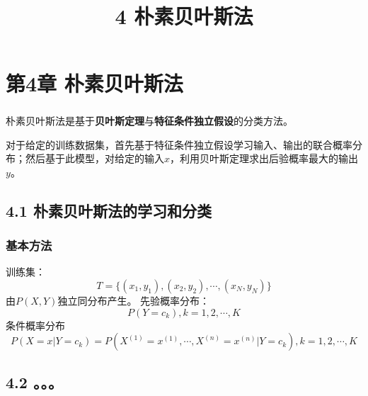 \documentclass{article}
\begin{document}
\title{4 朴素贝叶斯法}
\date{}
\maketitle
\else
\chapter{第4章 朴素贝叶斯法}
\fi

\paragraph{}
朴素贝叶斯法是基于\textbf{贝叶斯定理}与\textbf{特征条件独立假设}的分类方法。


对于给定的训练数据集，首先基于特征条件独立假设学习输入、输出的联合概率分布；然后基于此模型，对给定的输入$x$，利用贝叶斯定理求出后验概率最大的输出$y$。


\section{4.1 朴素贝叶斯法的学习和分类}
\subsection{基本方法}
训练集：
$$
T = \{(x_1, y_1), (x_2, y_2), \cdots, (x_N, y_N) \}
$$
由$P(X,Y)$独立同分布产生。
先验概率分布：
\begin{equation}
P(Y=c_k), k=1,2,\cdots,K
\end{equation}
条件概率分布
\begin{equation}
P(X=x|Y=c_k)=P(X^{(1)}=x^{(1)},\cdots, X^{(n)}=x^{(n)}|Y=c_k), k=1,2,\cdots,K
\end{equation}

\section{4.2 。。。}
\ifx\allfiles\undefined
\end{document}
